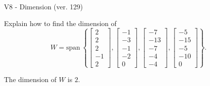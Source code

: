 \begin{exercise}
  \begin{exerciseTitle}V8 - Dimension (ver. 129)\end{exerciseTitle}
  \begin{exerciseStatement}
    Explain how to find the dimension of 
\[W=\mathrm{span}\ \left\{\left[\begin{array}{r}
2 \\
2 \\
2 \\
-1 \\
2
\end{array}\right] , \left[\begin{array}{r}
-1 \\
-3 \\
-1 \\
-2 \\
0
\end{array}\right] , \left[\begin{array}{r}
-7 \\
-13 \\
-7 \\
-4 \\
-4
\end{array}\right] , \left[\begin{array}{r}
-5 \\
-15 \\
-5 \\
-10 \\
0
\end{array}\right]\right\}.\]



  \end{exerciseStatement}
  \begin{exerciseAnswer}
   The dimension of \(W\) is  \(2\).
  


  \end{exerciseAnswer}
\end{exercise}